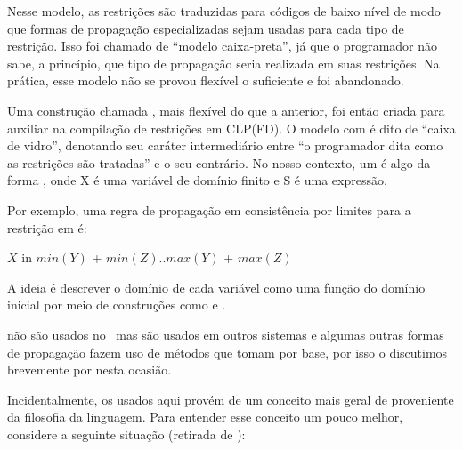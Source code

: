 Nesse modelo, as restrições são traduzidas para códigos de baixo nível de modo que formas de propagação especializadas sejam
usadas para cada tipo de restrição. Isso foi chamado de ``modelo caixa-preta'', já que o programador não sabe,
a princípio, que tipo de propagação seria realizada em suas restrições. Na prática, esse modelo não se provou flexível o suficiente
e foi abandonado.

Uma construção chamada , mais flexível do que a anterior, foi então criada para auxiliar na compilação de
restrições em CLP(FD). O modelo com  é dito de ``caixa de vidro'', denotando seu caráter intermediário entre
``o programador dita como as restrições são tratadas'' e o seu contrário. No nosso contexto, um
 é algo da forma , onde X é uma variável de domínio finito e S é uma expressão.

Por exemplo, uma regra de propagação em consistência por limites para a restrição 
em  é:

    $X$ in $min(Y)$ + $min(Z)..max(Y)$ + $max(Z)$

A ideia é descrever o domínio de cada variável como uma função do domínio inicial por meio de
construções como  e .

 não são usados no \eclipse\, mas são usados em outros sistemas e algumas outras formas de propagação fazem
uso de métodos que tomam  por base, por isso o discutimos brevemente por nesta ocasião.

Incidentalmente, os  usados aqui provém de um conceito mais geral de
 proveniente da filosofia da linguagem.
Para entender esse conceito um pouco melhor, considere a seguinte situação (retirada de \cite{raymond}):

